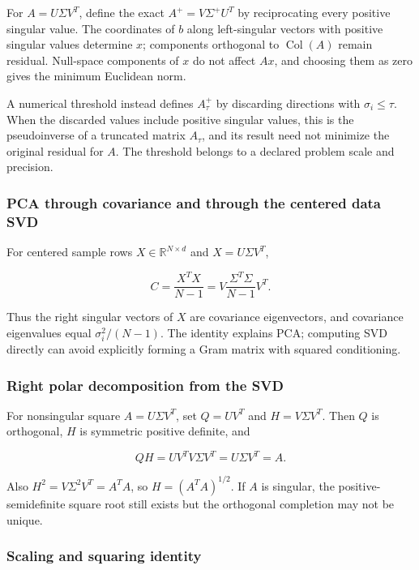 For \(A=U\Sigma V^T\), define the exact \(A^+=V\Sigma^+U^T\) by reciprocating every positive singular value. The coordinates of \(b\) along left-singular vectors with positive singular values determine \(x\); components orthogonal to \(\operatorname{Col}(A)\) remain residual. Null-space components of \(x\) do not affect \(Ax\), and choosing them as zero gives the minimum Euclidean norm.

A numerical threshold instead defines \(A_\tau^+\) by discarding directions with \(\sigma_i\le\tau\). When the discarded values include positive singular values, this is the pseudoinverse of a truncated matrix \(A_\tau\), and its result need not minimize the original residual for \(A\). The threshold belongs to a declared problem scale and precision.

\subsubsection{PCA through covariance and through the centered data SVD}\label{02-foundations-ii-ch039-pca-through-covariance-and-through-the-centered-data-svd}

For centered sample rows \(X\in\mathbb R^{N\times d}\) and \(X=U\Sigma V^T\),

\[
C=\frac{X^TX}{N-1}
=V\frac{\Sigma^T\Sigma}{N-1}V^T.
\]

Thus the right singular vectors of \(X\) are covariance eigenvectors, and covariance eigenvalues equal \(\sigma_i^2/(N-1)\). The identity explains PCA; computing SVD directly can avoid explicitly forming a Gram matrix with squared conditioning.

\subsubsection{Right polar decomposition from the SVD}\label{02-foundations-ii-ch039-right-polar-decomposition-from-the-svd}

For nonsingular square \(A=U\Sigma V^T\), set \(Q=UV^T\) and \(H=V\Sigma V^T\). Then \(Q\) is orthogonal, \(H\) is symmetric positive definite, and

\[
QH=UV^TV\Sigma V^T=U\Sigma V^T=A.
\]

Also \(H^2=V\Sigma^2V^T=A^TA\), so \(H=(A^TA)^{1/2}\). If \(A\) is singular, the positive-semidefinite square root still exists but the orthogonal completion may not be unique.

\subsubsection{Scaling and squaring identity}\label{02-foundations-ii-ch039-scaling-and-squaring-identity}

